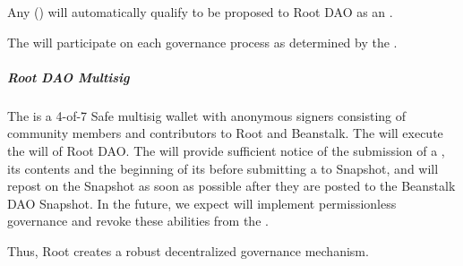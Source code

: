 \documentclass[class=article, crop=false]{standalone}
\begin{document}
Any  () will automatically qualify to be proposed to Root DAO as an .

The  will participate on each governance process as determined by the .

\subparagraph{Root DAO Multisig}
The  is a 4-of-7 Safe multisig wallet with anonymous signers consisting of community members and contributors to Root and Beanstalk. The  will execute the will of Root DAO. The  will provide sufficient notice of the submission of a , its contents and the beginning of its  before submitting a  to Snapshot, and will repost  on the  Snapshot as soon as possible after they are posted to the Beanstalk DAO Snapshot. In the future, we expect  will implement permissionless governance and revoke these abilities from the .

Thus, Root creates a robust decentralized governance mechanism.
\end{document}
